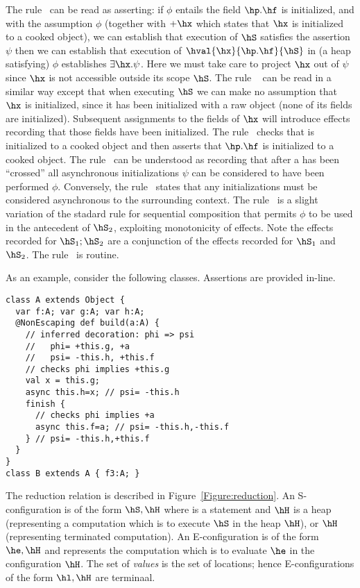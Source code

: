 The rule~ can be read as asserting: if $\phi$ entails
the field $\hp.\hf$ is initialized, and with the assumption $\phi$
(together with $+\hx$ which states that $\hx$ is initialized to a
cooked object), we can establish that execution of $\hS$ satisfies the assertion
$\psi$ then we can establish that execution of
$\hval{\hx}{\hp.\hf}{\hS}$ in
(a heap satisfying) $\phi$ establishes $\exists \hx.\psi$. Here we
must take care to project $\hx$ out of $\psi$ since $\hx$ is not
accessible outside its scope $\hS$.
The rule ~ can be read in a similar way except that when
executing $\hS$ we can make no assumption that $\hx$ is initialized,
since it has been initialized with a raw object (none of its fields
are initialized). Subsequent assignments to the fields of $\hx$ will
introduce effects recording that those fields have been initialized.
The rule~ checks that \hq{} is initialized to a
cooked object and then asserts that $\hp.\hf$ is initialized to a
cooked object.
The rule~ can be understood as recording that after a
\finish{} has been ``crossed'' all asynchronous initializations $\psi$
can be considered to have been performed $\phi$. Conversely,
the rule~ states that any initializations must be
considered asynchronous to the surrounding context.
The rule~ is a slight variation of the stadard rule for
sequential composition that permits $\phi$ to be used in the
antecedent of $\hS_2$, exploiting monotonicity of effects. Note the
effects recorded for $\hS_1;\hS_2$ are a conjunction of the effects
recorded for $\hS_1$ and $\hS_2$.
The rule~ is routine.

As an example, consider the following classes. Assertions are provided
in-line.
\begin{lstlisting}
class A extends Object {
  var f:A; var g:A; var h:A;
  @NonEscaping def build(a:A) {
    // inferred decoration: phi => psi
    //   phi= +this.g, +a
    //   psi= -this.h, +this.f
    // checks phi implies +this.g
    val x = this.g;
    async this.h=x; // psi= -this.h
    finish {
      // checks phi implies +a
      async this.f=a; // psi= -this.h,-this.f
    } // psi= -this.h,+this.f
  }
}
class B extends A { f3:A; }
\end{lstlisting}



The reduction relation is described in
Figure~\ref{Figure:reduction}. An S-configuration is of the form
$\hS,\hH$ where \hS{} is a statement and $\hH$ is a heap (representing a
computation which is to execute $\hS$ in the heap $\hH$), or $\hH$
(representing terminated computation). An
E-configuration is of the form $\he,\hH$ and represents the
computation which is to evaluate $\he$ in the configuration $\hH$. The
set of {\em values} is the set of locations; hence E-configurations of
the form $\hl,\hH$ are terminaal.

